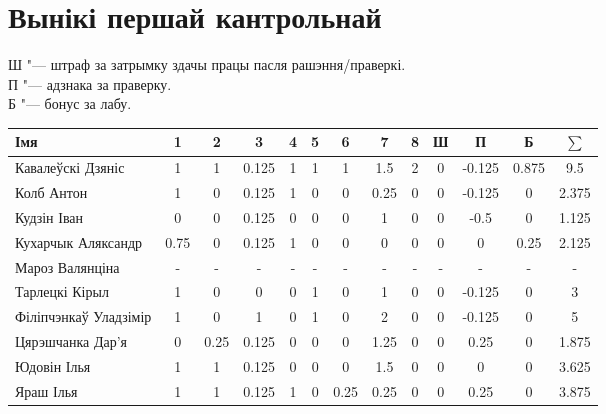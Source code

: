 


	\section{Вынікі першай кантрольнай}
	\noindent Ш "--- штраф за затрымку здачы працы пасля рашэння/праверкі. \\
	П "--- адзнака за праверку. \\
	Б "--- бонус за лабу.
\begin{table}[H]
	\begin{tabular}{|l|c|c|c|c|c|c|c|c|c|c|c|c|}
		\hline
		Імя                 & 1 & 2   & 3   & 4    & 5    & 6 & 7   & 8    & Ш   & П    & Б    & $\sum$ \\ \hline
		Кавалеўскі Дзяніс & 1 & 1 & 0.125 & 1 & 1 & 1 & 1.5 & 2 & 0  & -0.125 & 0.875 & 9.5 \\ \hline
		Колб Антон & 1 & 0 & 0.125 & 1 & 0 & 0 & 0.25 & 0 & 0 & -0.125 & 0 & 2.375 \\ \hline
		Кудзін Іван & 0 & 0 & 0.125 & 0 & 0 & 0 & 1 & 0 & 0 & -0.5 & 0 & 1.125 \\ \hline
		Кухарчык Аляксандр & 0.75 & 0 & 0.125 & 1 & 0 & 0 & 0 & 0 & 0 & 0 & 0.25 & 2.125 \\ \hline
		Мароз Валянціна & - & - & - & - & - & - & - & - & - & - & - & - \\ \hline
		Тарлецкі Кірыл & 1 & 0 & 0 & 0 & 1 & 0 & 1 & 0 & 0 & -0.125 & 0 & 3 \\ \hline
		Філіпчэнкаў Уладзімір & 1 & 0 & 1 & 0 & 1 & 0 & 2 & 0 & 0 & -0.125 & 0 & 5 \\ \hline
		Цярэшчанка Дар'я & 0 & 0.25 & 0.125 & 0 & 0 & 0 & 1.25 & 0 & 0 & 0.25 & 0 & 1.875 \\ \hline
		Юдовін Ілья & 1 & 1 & 0.125 & 0 & 0 & 0 & 1.5 & 0 & 0 & 0 & 0 & 3.625 \\ \hline
		Яраш Ілья & 1 & 1 & 0.125 & 1 & 0 & 0.25 & 0.25 & 0 & 0 & 0.25 & 0 & 3.875 \\ \hline
	\end{tabular}
\end{table}
	
